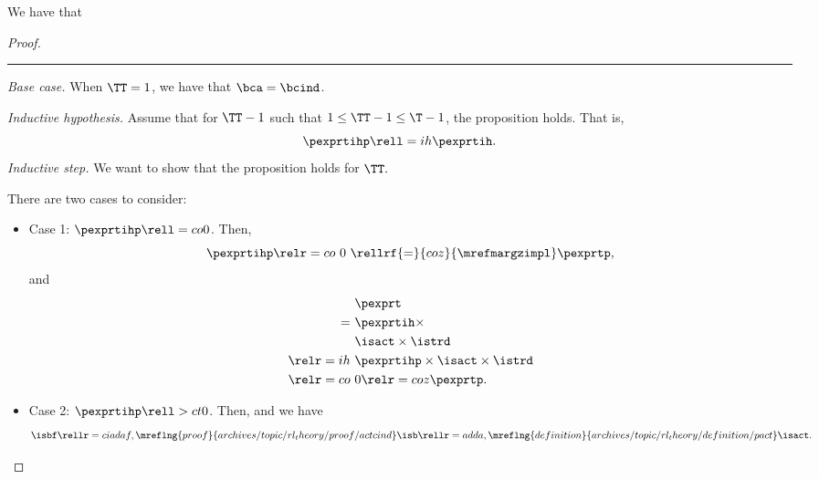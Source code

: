 \begin{proposition}
  We have that %
\end{proposition}

\begin{proof}
  \hrule
  {\it Base case.}
  When $\TT = 1$,
  we have  that
  $\bca = \bcind$.

  \serule
  {\it Inductive hypothesis.}
  Assume that for $\TT - 1$ such that $1 \le \TT - 1 \le \T - 1$,
  the proposition holds. That is,
  $$ \pexprtihp \rell = ih \pexprtih.$$%
  \srule
  {\it Inductive step.}
  We want to show that the proposition holds for $\TT.$

  There are two cases to consider:
  \begin{itemize}
    \item Case 1: $\pexprtihp \rell = co 0$. 
      Then,
      $$\pexprtihp \relr = co \ 0\  \rellrf{=}{coz}{\mrefmargzimpl} \pexprtp,$$
      and
      \begin{align*}
        &\pexprt \\
        =\ &\pexprtih \times \\
        &\isact \times \istrd\\
        \relr = ih \ & \pexprtihp \times \isact \times \istrd \\
        \relr = co \ & 0 \relr = coz \pexprtp.
      \end{align*}
    \item Case 2: $\pexprtihp \rell > ct 0$. 
      Then, 
      and we have
      $$\isbf \rellr = cia daf,\mreflng{proof}{archives/topic/rl_theory/proof/actcind} \isb 
      \rellr = ad da,\mreflng{definition}{archives/topic/rl_theory/definition/pact} \isact.$$


\end{itemize}
\end{proof}
